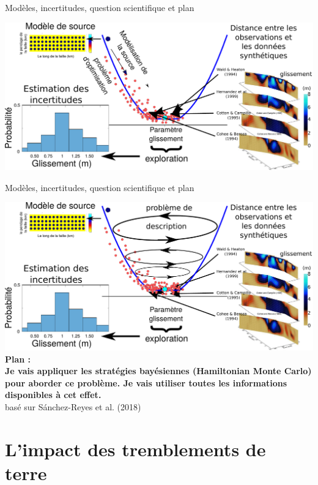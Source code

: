 \documentclass{beamer}
\begin{document}
\begin{frame}
 {Modèles, incertitudes, question scientifique et plan}

 \vskip -0cm
 \includegraphics[width=1\linewidth]{images/uncertainty_3.pdf}
 \begin{center}
 \end{center}
 \addtocounter{framenumber}{-1}
 
\end{frame}


\begin{frame}
 {Modèles, incertitudes, question scientifique et plan}

 \vskip -0cm
 \includegraphics[width=1\linewidth]{images/uncertainty_4.pdf}
 \vskip -0.3cm {\bf Plan :} \\
 {\bf \small Je vais appliquer les stratégies bayésiennes (Hamiltonian Monte Carlo) pour aborder ce problème. Je vais utiliser toutes les informations disponibles à cet effet.} \\
 \hfill {\scriptsize basé sur S\'anchez-Reyes et al. (2018)}
 \addtocounter{framenumber}{-1}
 
\end{frame}


\section{L'impact des tremblements de terre}
\end{document}
